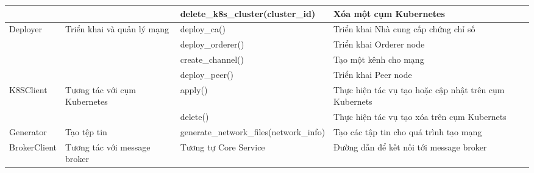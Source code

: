 \documentclass[../DoAn.tex]{subfiles}
\begin{document}
\begin{longtable}{|p{}|p{}|p{}|p{}|}
                                                  &                                                                           & delete\_k8s\_cluster\hspace{0pt}(cluster\_id)                   & Xóa một cụm Kubernetes                                                    \\ \hline
    \multirow[t]{4}{0.175\textwidth}{Deployer}    & \multirow[t]{4}{0.175\textwidth}{Triển khai và quản lý mạng}              & deploy\_ca()                                                    & Triển khai Nhà cung cấp chứng chỉ số                                      \\ \cline{3-4}
                                                  &                                                                           & deploy\_orderer()                                               & Triển khai Orderer node                                                   \\ \cline{3-4}
                                                  &                                                                           & create\_channel()                                               & Tạo một kênh cho mạng                                                     \\ \cline{3-4}
                                                  &                                                                           & deploy\_peer()                                                  & Triển khai Peer node                                                      \\ \hline
    \multirow[t]{2}{0.175\textwidth}{K8SClient}   & \multirow[t]{2}{0.175\textwidth}{Tương tác với cụm Kubernetes}            & apply()                                                         & Thực hiện tác vụ tạo hoặc cập nhật trên cụm Kubernets                     \\ \cline{3-4}
                                                  &                                                                           & delete()                                                        & Thực hiện tác vụ tạo xóa trên cụm Kubernets                               \\ \hline
    Generator                                     & Tạo tệp tin                                                               & generate\_network\_\hspace{0pt}files\hspace{0pt}(network\_info) & Tạo các tập tin cho quá trình tạo mạng                                    \\ \hline
    BrokerClient                                  & Tương tác với message broker                                              & Tương tự Core Service                                           & Đường dẫn để kết nối tới message broker                                   \\ \hline
\end{longtable}
\end{document}
